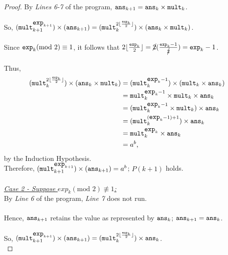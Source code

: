 \documentclass[12pt]{article}
\begin{document}
\begin{proof}
    By \textit{Lines 6-7} of the program, \(\verb|ans|_{k + 1} = \verb|ans|_k \times \verb|mult|_k\). \\
    \\
    So, \((\verb|mult|_{k + 1}^{\verb|exp|_{k + 1}}) \times (\verb|ans|_{k + 1}) = (\verb|mult|_k^{2 \lfloor \frac{\texttt{exp}_k}{2} \rfloor}) \times (\verb|ans|_k \times \verb|mult|_k)\). \\
    \\
    Since \(\verb|exp|_k (\text{mod } 2) \equiv 1\), it follows that \(2 \lfloor \frac{\texttt{exp}_k}{2} \rfloor = \cancel{2} (\frac{\texttt{exp}_k - 1}{\cancel{2}}) = \verb|exp|_k - 1\). \\
    \\
    Thus,
    \begin{equation*}
        \begin{aligned}
            (\verb|mult|_k^{2 \lfloor \frac{\texttt{exp}_k}{2} \rfloor}) \times (\verb|ans|_k \times \verb|mult|_k) &= (\verb|mult|_k^{\verb|exp|_k - 1}) \times (\verb|mult|_k \times \verb|ans|_k) \\
            &= \verb|mult|_k^{\verb|exp|_k - 1} \times \verb|mult|_k \times \verb|ans|_k \\
            &= (\verb|mult|_k^{\verb|exp|_k - 1} \times \verb|mult|_k) \times \verb|ans|_k \\
            &= (\verb|mult|_k^{(\verb|exp|_k - 1) + 1}) \times \verb|ans|_k \\
            &= \verb|mult|_k^{\verb|exp|_k} \times \verb|ans|_k \\
            &= a^b \text{,}
        \end{aligned}
    \end{equation*}
    by the Induction Hypothesis.
    \\
    Therefore, \((\verb|mult|_{k + 1}^{\verb|exp|_{k + 1}}) \times (\verb|ans|_{k + 1}) = a^b\); $P(k + 1)$ holds. \\
    \\
    \underline{\textit{Case 2 - Suppose \(exp_k (\text{mod } 2) \not\equiv 1\):}} \\
    By \textit{Line 6} of the program, \textit{Line 7} does not run. \\
    \\
    Hence, $\verb|ans|_{k + 1}$ retains the value as represented by $\verb|ans|_k$; \(\verb|ans|_{k + 1} = \verb|ans|_k\). \\
    \\
    So, \((\verb|mult|_{k + 1}^{\verb|exp|_{k + 1}}) \times (\verb|ans|_{k + 1}) = (\verb|mult|_k^{2 \lfloor \frac{\texttt{exp}_k}{2} \rfloor}) \times \verb|ans|_k\). \\

\end{proof}
\end{document}
